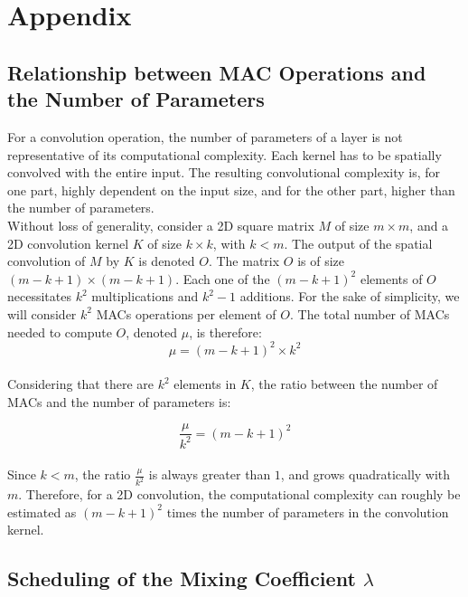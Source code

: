 \appendix

\chapter{Appendix}

\section{Relationship between \acl{MAC} Operations and the Number of Parameters}\label{sec:appendix:macs}

For a convolution operation, the number of parameters of a layer is not
representative of its computational complexity. Each kernel has to be spatially
convolved with the entire input. The resulting convolutional complexity is, for
one part, highly dependent on the input size, and for the other part, higher
than the number of parameters.\\

Without loss of generality, consider a 2D square matrix $M$ of size $m \times
    m$, and a 2D convolution kernel $K$ of size $k \times k$, with $k<m$. The output
of the spatial convolution of $M$ by $K$ is denoted $O$. The matrix $O$ is of
size $(m-k+1) \times (m-k+1)$. Each one of the $(m-k+1)^2$ elements of $O$
necessitates $k^2$ multiplications and $k^2-1$ additions. For the sake of
simplicity, we will consider $k^2$ \acfp{MAC} operations per element of $O$. The
total number of \acp{MAC} needed to compute $O$, denoted $\mu$, is therefore:\\
$$
    \mu = (m-k+1)^2 \times k^2
$$\\

Considering that there are $k^2$ elements in $K$, the ratio between the number
of \acp{MAC} and the number of parameters is:

$$
    \frac{\mu}{k^2} = (m-k+1)^2
$$\\


Since $k<m$, the ratio $\frac{\mu}{k^2}$ is always greater than $1$, and grows
quadratically with $m$. Therefore, for a 2D convolution, the computational
complexity can roughly be estimated as $(m-k+1)^2$ times the number of
parameters in the convolution kernel.\\

\section{Scheduling of the Mixing Coefficient \texorpdfstring{$\lambda$}{lambda}}
\label{sec:appendix:annihilation}

